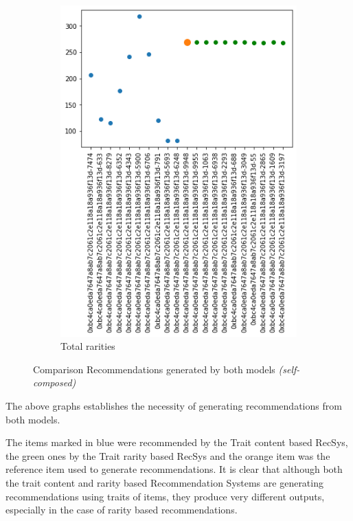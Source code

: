 \begin{figure}[h!]
\begin{subfigure}[b]{0.45\textwidth}
         \includegraphics[width=\textwidth]{images/Testing/Total rarities content + rarity based.png}
         \caption{Total rarities}
         \label{fig:1-2}
     \end{subfigure}
     \hfill
        \caption{Comparison Recommendations generated by both models \textit{(self-composed)}}
        \label{fig:1}
\end{figure}

The above graphs establishes the necessity of generating recommendations from both models.

The items marked in blue were recommended by the Trait content based RecSys, the green ones by the Trait rarity based RecSys and the orange item was the reference item used to generate recommendations.
It is clear that although both the trait content and rarity based Recommendation Systems are generating recommendations using traits of items, they produce very different outputs, especially in the case of rarity based recommendations.


